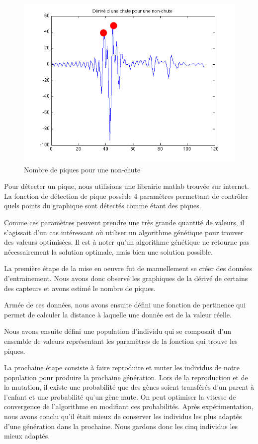 \documentclass[12pt,letterpaper]{article}
\begin{document}
\begin{figure}[htp]
\centering
\includegraphics[scale=0.5]{images/piques_nonchute.png}
\caption{Nombre de piques pour une non-chute}
\label{fig:nonchute}
\end{figure}


Pour détecter un pique, nous utilisions une librairie matlab trouvée sur internet. La fonction de détection de pique
possède 4 paramètres permettant de contrôler quels points du graphique sont détectés comme étant des piques.

Comme ces paramètres peuvent prendre une très grande quantité de valeurs, il s'agissait d'un cas intéressant où utiliser
un algorithme génétique pour trouver des valeurs optimisées. Il est à noter qu'un algorithme génétique ne retourne pas
nécessairement la solution optimale, mais bien une solution possible.

La première étape de la mise en oeuvre fut de manuellement se créer des données d'entrainement. Nous avons donc
observé les graphiques de la dérivé de certains des capteurs et avons estimé le nombre de piques.

Armée de ces données, nous avons ensuite défini une fonction de pertinence qui permet de calculer la distance à laquelle
une donnée est de la valeur réelle.

Nous avons ensuite défini une population d'individu qui se composait d'un ensemble de valeurs représentant les paramètres de la fonction qui trouve les piques.

La prochaine étape consiste à faire reproduire et muter les individus de notre population pour produire la prochaine génération.
Lors de la reproduction et de la mutation, il existe une probabilité que des gènes soient transférés d'un parent à l'enfant et une
probabilité qu'un gène mute. On peut optimiser la vitesse de convergence de l'algorithme en modifiant ces probabilités. Après
expérimentation, nous avons conclu qu'il était mieux de conserver les individus les plus adaptés d'une génération dans la prochaine.
Nous gardons donc les cinq individus les mieux adaptés.
\end{document}
